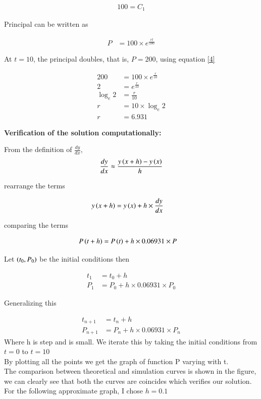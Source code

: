 \documentclass[journal]{IEEEtran}
\numberwithin{equation}{enumi}
\numberwithin{figure}{enumi}
\begin{document}
\begin{align}
    100 = C_1
\end{align}

Principal can be written as

\begin{align}
    P &= 100 \times e^{\frac{rt}{100}} \label{4}
\end{align}

At $t = 10$, the principal doubles, that is, $P = 200$, using equation \eqref{4}

\begin{align}
    200 &= 100 \times e^{\frac{r}{10}}\\
    2 &= e^{\frac{r}{10}}\\
    \log_e{2} &= \frac{r}{10}\\
    r &= 10 \times \log_e{2}\\
    r &= 6.931
\end{align}

\textbf{Verification of the solution computationally:}

From the definition of $\frac{dy}{dx}$,
\begin{align}
    \frac{dy}{dx} \approx \frac{y\left(x + h\right) - y\left(x\right)}{h}
\end{align}

rearrange the terms 

\begin{align}
    y\left(x + h\right) &= y\left(x\right) + h \times \frac{dy}{dx}
\end{align}

comparing the terms

\begin{align}
    P\left(t + h\right) &= P\left(t\right) + h \times 0.06931 \times P
\end{align}

Let $\left(t_0, P_0\right)$ be the initial conditions then 

\begin{align}
    t_1 &= t_0 + h\\
    P_1 &= P_0 + h \times 0.06931 \times P_0
\end{align}

Generalizing this 

\begin{align}
    t_{n+1} &= t_{n}+h \\
    P_{n+1} &= P_{n}+h \times 0.06931 \times P_n
\end{align}
Where h is step and is small.
We iterate this by taking the initial conditions from $t = 0$ to $t = 10$\\
By plotting all the points  we get the graph of function P varying with t.\\
The comparison between theoretical and simulation curves is shown in the figure, we can clearly see that both the curves are coincides which verifies our solution.\\
For the following approximate graph, I chose $h = 0.1$
\end{document}
